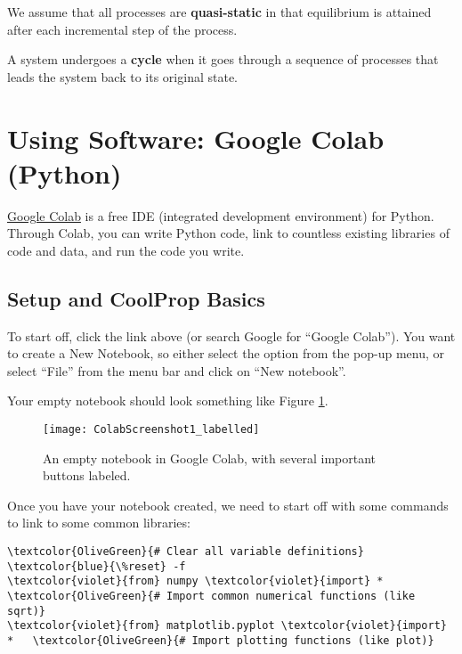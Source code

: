 We assume that all processes are {\bf quasi-static} in that equilibrium is attained after each incremental step of the process.

A system undergoes a {\bf cycle} when it goes through a sequence of processes that leads the system back to its original state.

\section{Using Software: Google Colab (Python)} \label{sec:ch1_colab}
\href{https://colab.research.google.com}{Google Colab} is a free IDE (integrated development environment) for Python.  Through Colab, you can write Python code, link to countless existing libraries of code and data, and run the code you write.

\subsection{Setup and CoolProp Basics}
To start off, click the link above (or search Google for ``Google Colab'').  You want to create a New Notebook, so either select the option from the pop-up menu, or select ``File'' from the menu bar and click on ``New notebook''.

Your empty notebook should look something like Figure \ref{fig:ColabScreenshot1}.

\begin{figure}[H]
\centering
\texttt{[image: ColabScreenshot1\_labelled]}
\caption{An empty notebook in Google Colab, with several important buttons labeled.}
\label{fig:ColabScreenshot1}
\end{figure}

Once you have your notebook created, we need to start off with some commands to link to some common libraries:

\begin{Verbatim}[commandchars=\\\{\}]
\textcolor{OliveGreen}{# Clear all variable definitions}
\textcolor{blue}{\%reset} -f                         
\textcolor{violet}{from} numpy \textcolor{violet}{import} *               \textcolor{OliveGreen}{# Import common numerical functions (like sqrt)}
\textcolor{violet}{from} matplotlib.pyplot \textcolor{violet}{import} *   \textcolor{OliveGreen}{# Import plotting functions (like plot)}
\end{Verbatim}

